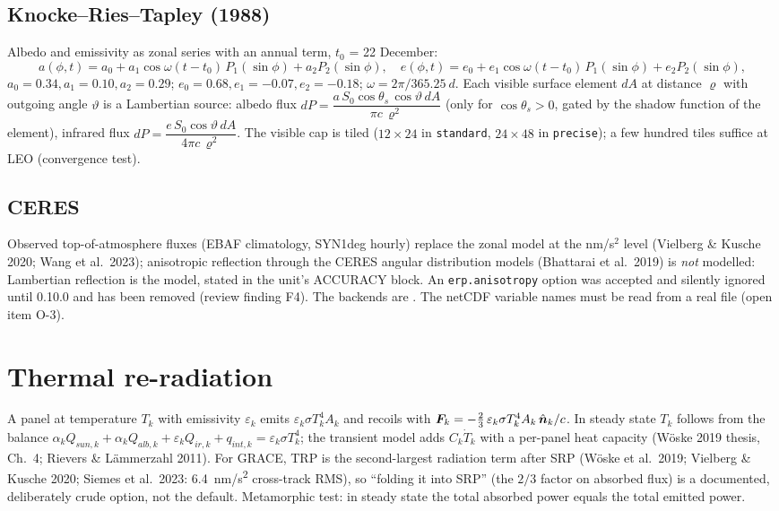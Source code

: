 \subsection{Knocke--Ries--Tapley (1988)}
Albedo and emissivity as zonal series with an annual term, $t_0$ = 22 December:
\begin{equation}
a(\phi,t)=a_0+a_1\cos\omega(t-t_0)\,P_1(\sin\phi)+a_2P_2(\sin\phi),\quad
e(\phi,t)=e_0+e_1\cos\omega(t-t_0)\,P_1(\sin\phi)+e_2P_2(\sin\phi),
\end{equation}
$a_0=0.34,a_1=0.10,a_2=0.29$; $e_0=0.68,e_1=-0.07,e_2=-0.18$; $\omega=2\pi/\SI{365.25}{d}$. Each visible surface element $dA$ at distance $\varrho$ with outgoing angle $\vartheta$ is a Lambertian source: albedo flux $dP=\dfrac{a\,S_0\cos\theta_s\,\cos\vartheta\,dA}{\pi c\,\varrho^2}$ (only for $\cos\theta_s>0$, gated by the shadow function of the element), infrared flux $dP=\dfrac{e\,S_0\cos\vartheta\,dA}{4\pi c\,\varrho^2}$. The visible cap is tiled ($12\times24$ in \texttt{standard}, $24\times48$ in \texttt{precise}); a few hundred tiles suffice at LEO (convergence test).
\subsection{CERES}
Observed top-of-atmosphere fluxes (EBAF climatology, SYN1deg hourly) replace the zonal model at the nm/s$^2$ level (Vielberg \& Kusche 2020; Wang et al.\ 2023); anisotropic reflection through the CERES angular distribution models (Bhattarai et al.\ 2019) is \emph{not} modelled: Lambertian reflection is the model, stated in the unit's ACCURACY block. An \texttt{erp.anisotropy} option was accepted and silently ignored until 0.10.0 and has been removed (review finding F4). The backends are \ngfopterpbackend. The netCDF variable names must be read from a real file (open item O-3).

\section{Thermal re-radiation}\label{sec:trp}
A panel at temperature $T_k$ with emissivity $\varepsilon_k$ emits $\varepsilon_k\sigma T_k^4A_k$ and recoils with
$\bm{F}_k=-\tfrac23\,\varepsilon_k\sigma T_k^4A_k\,\hat{\bm{n}}_k/c$. In steady state $T_k$ follows from the balance $\alpha_kQ_{sun,k}+\alpha_kQ_{alb,k}+\varepsilon_kQ_{ir,k}+q_{int,k}=\varepsilon_k\sigma T_k^4$; the transient model adds $C_k\dot T_k$ with a per-panel heat capacity (Wöske 2019 thesis, Ch.~4; Rievers \& Lämmerzahl 2011). For GRACE, TRP is the second-largest radiation term after SRP (Wöske et al.\ 2019; Vielberg \& Kusche 2020; Siemes et al.\ 2023: \SI{6.4}{nm/s^2} cross-track RMS), so ``folding it into SRP'' (the $2/3$ factor on absorbed flux) is a documented, deliberately crude option, not the default. Metamorphic test: in steady state the total absorbed power equals the total emitted power.

